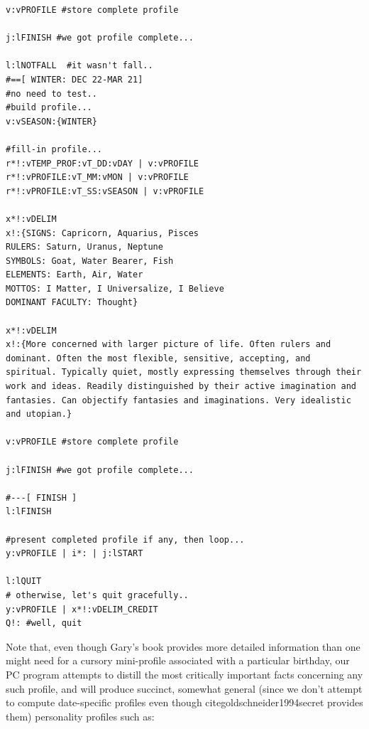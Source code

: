 \documentclass[a4paper, 18pt]{book} %
\begin{document}
{{{\begin{tcolorbox}[teaterminalstyle, title=TEA Program: Personality Calculator v3, breakable]
\begin{lstlisting}[language=TEA,breaklines=true,]
v:vPROFILE #store complete profile

j:lFINISH #we got profile complete...

l:lNOTFALL  #it wasn't fall..
#==[ WINTER: DEC 22-MAR 21]
#no need to test.. 
#build profile...
v:vSEASON:{WINTER}

#fill-in profile...
r*!:vTEMP_PROF:vT_DD:vDAY | v:vPROFILE
r*!:vPROFILE:vT_MM:vMON | v:vPROFILE
r*!:vPROFILE:vT_SS:vSEASON | v:vPROFILE

x*!:vDELIM 
x!:{SIGNS: Capricorn, Aquarius, Pisces
RULERS: Saturn, Uranus, Neptune
SYMBOLS: Goat, Water Bearer, Fish
ELEMENTS: Earth, Air, Water
MOTTOS: I Matter, I Universalize, I Believe
DOMINANT FACULTY: Thought}

x*!:vDELIM 
x!:{More concerned with larger picture of life. Often rulers and dominant. Often the most flexible, sensitive, accepting, and spiritual. Typically quiet, mostly expressing themselves through their work and ideas. Readily distinguished by their active imagination and fantasies. Can objectify fantasies and imaginations. Very idealistic and utopian.}

v:vPROFILE #store complete profile

j:lFINISH #we got profile complete...

#---[ FINISH ]
l:lFINISH

#present completed profile if any, then loop...
y:vPROFILE | i*: | j:lSTART

l:lQUIT
# otherwise, let's quit gracefully..
y:vPROFILE | x*!:vDELIM_CREDIT
Q!: #well, quit
   \end{lstlisting}
  \end{tcolorbox}
  \label{FIGQEX1}
  \vspace{1cm}
  

\vspace{2em}
  

Note that, even though Gary's book provides more detailed information than one might need for a cursory mini-profile associated with a particular birthday, our PC program attempts to distill the most critically important facts concerning any such profile, and will produce succinct, somewhat general (since we don't attempt to compute date-specific profiles even though cite{goldschneider1994secret} provides them) personality profiles such as:


\vspace{2em}
  
}}}
\end{document}

